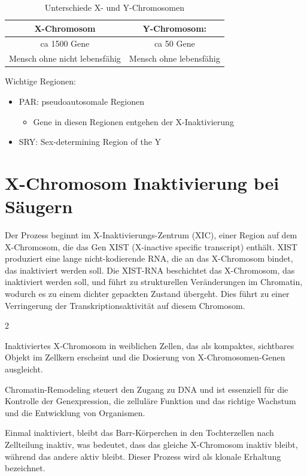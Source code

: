 \documentclass{article}
\begin{document}
\begin{table}[H]
    \centering
    \begin{tabular}{c|c}
    X-Chromosom & Y-Chromosom: \\ \hline
     ca 1500 Gene & ca 50 Gene \\
     Mensch ohne nicht lebensfähig & Mensch ohne lebensfähig \\
    \end{tabular}
    \caption{Unterschiede X- und Y-Chromosomen}
    \label{tab:my_label}
\end{table}
Wichtige Regionen: \newline
\begin{itemize}
    \item PAR: pseudoautosomale Regionen
    \begin{itemize}
        \item Gene in diesen Regionen entgehen der X-Inaktivierung
    \end{itemize}
    \item SRY: Sex-determining Region of the Y
\end{itemize}


\section{X-Chromosom Inaktivierung bei Säugern}
Der Prozess beginnt im X-Inaktivierungs-Zentrum (XIC), einer Region auf dem X-Chromosom, die das Gen XIST (X-inactive specific transcript) enthält. XIST produziert eine lange nicht-kodierende RNA, die an das X-Chromosom bindet, das inaktiviert werden soll. \newline
Die XIST-RNA beschichtet das X-Chromosom, das inaktiviert werden soll, und führt zu strukturellen Veränderungen im Chromatin, wodurch es zu einem dichter gepackten Zustand übergeht. Dies führt zu einer Verringerung der Transkriptionsaktivität auf diesem Chromosom. 
\begin{multicols}{2}
\begin{mybox}[title=Barr-Körperchen]
Inaktiviertes X-Chromosom in weiblichen Zellen, das als kompaktes, sichtbares Objekt im Zellkern erscheint und die Dosierung von X-Chromosomen-Genen ausgleicht.
\end{mybox}
\columnbreak
\begin{mechanism}[title=Chromatin-Remodeling]
Chromatin-Remodeling steuert den Zugang zu DNA und ist essenziell für die Kontrolle der Genexpression, die zelluläre Funktion und das richtige Wachstum und die Entwicklung von Organismen.
\end{mechanism}
\end{multicols} 
\noindent Einmal inaktiviert, bleibt das Barr-Körperchen in den Tochterzellen nach Zellteilung inaktiv, was bedeutet, dass das gleiche X-Chromosom inaktiv bleibt, während das andere aktiv bleibt. Dieser Prozess wird als klonale Erhaltung bezeichnet.
\end{document}
